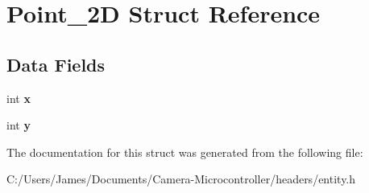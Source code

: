 \hypertarget{struct_point__2_d}{}\section{Point\+\_\+2D Struct Reference}
\label{struct_point__2_d}
\subsection*{Data Fields}
\begin{DoxyCompactItemize}
\item 
\mbox{\label{struct_point__2_d_a6150e0515f7202e2fb518f7206ed97dc}} 
int {\bfseries x}
\item 
\mbox{\label{struct_point__2_d_a0a2f84ed7838f07779ae24c5a9086d33}} 
int {\bfseries y}
\end{DoxyCompactItemize}


The documentation for this struct was generated from the following file\+:\begin{DoxyCompactItemize}
\item 
C\+:/\+Users/\+James/\+Documents/\+Camera-\/\+Microcontroller/headers/entity.\+h\end{DoxyCompactItemize}
